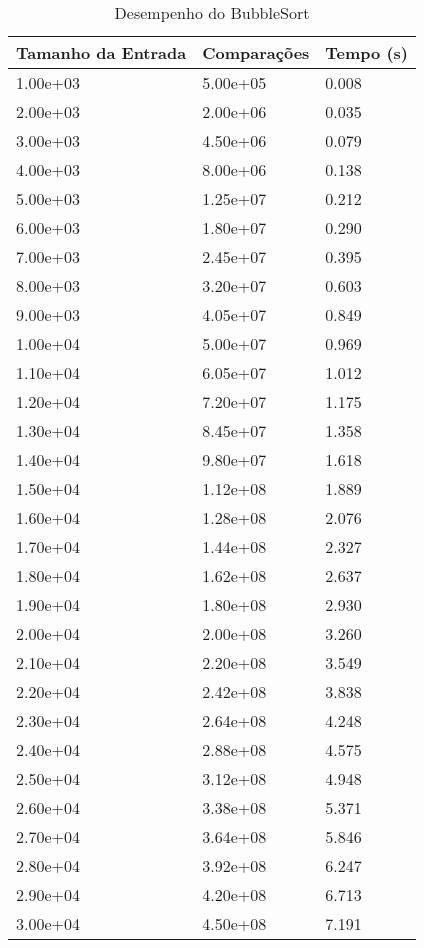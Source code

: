 \begin{table}
\caption{Desempenho do BubbleSort}
\label{tab:bubblesort}
\begin{tabular}{lll}
\toprule
Tamanho da Entrada & Comparações & Tempo (s) \\
\midrule
1.00e+03 & 5.00e+05 & 0.008 \\
2.00e+03 & 2.00e+06 & 0.035 \\
3.00e+03 & 4.50e+06 & 0.079 \\
4.00e+03 & 8.00e+06 & 0.138 \\
5.00e+03 & 1.25e+07 & 0.212 \\
6.00e+03 & 1.80e+07 & 0.290 \\
7.00e+03 & 2.45e+07 & 0.395 \\
8.00e+03 & 3.20e+07 & 0.603 \\
9.00e+03 & 4.05e+07 & 0.849 \\
1.00e+04 & 5.00e+07 & 0.969 \\
1.10e+04 & 6.05e+07 & 1.012 \\
1.20e+04 & 7.20e+07 & 1.175 \\
1.30e+04 & 8.45e+07 & 1.358 \\
1.40e+04 & 9.80e+07 & 1.618 \\
1.50e+04 & 1.12e+08 & 1.889 \\
1.60e+04 & 1.28e+08 & 2.076 \\
1.70e+04 & 1.44e+08 & 2.327 \\
1.80e+04 & 1.62e+08 & 2.637 \\
1.90e+04 & 1.80e+08 & 2.930 \\
2.00e+04 & 2.00e+08 & 3.260 \\
2.10e+04 & 2.20e+08 & 3.549 \\
2.20e+04 & 2.42e+08 & 3.838 \\
2.30e+04 & 2.64e+08 & 4.248 \\
2.40e+04 & 2.88e+08 & 4.575 \\
2.50e+04 & 3.12e+08 & 4.948 \\
2.60e+04 & 3.38e+08 & 5.371 \\
2.70e+04 & 3.64e+08 & 5.846 \\
2.80e+04 & 3.92e+08 & 6.247 \\
2.90e+04 & 4.20e+08 & 6.713 \\
3.00e+04 & 4.50e+08 & 7.191 \\
\bottomrule
\end{tabular}
\end{table}
